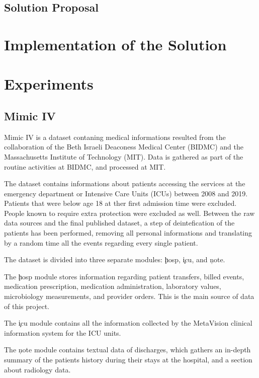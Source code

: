 \documentclass[]{marticle}
\begin{document}
\subsection{Solution Proposal}

\section{Implementation of the Solution}

\section{Experiments}

\subsection{Mimic IV}

Mimic IV \cite{mimic-iv-cit} is a dataset contaning medical informations resulted from the collaboration
of the Beth Israeli Deaconess Medical Center (BIDMC) and the Massachusetts Institute of Technology
(MIT). Data is gathered as part of the routine activities at BIDMC, and processed at MIT.

The dataset contains informations about patients accessing the services at the emergency department
or Intensive Care Units (ICUs) between 2008 and 2019. Patients that were below age 18 at ther first
admission time were excluded. People known to require extra protection were excluded as well.
Between the raw data sources and the final published dataset, a step of deintefication of the
patients has been performed, removing all personal informations and translating by a random time all
the events regarding every single patient.

The dataset is divided into three separate modules: \c{hosp}, \c{icu}, and \c{note}.

The \c{hosp} module stores information regarding patient transfers, billed events, medication
prescription, medication administration, laboratory values, microbiology measurements, and provider
orders. This is the main source of data of this project.

The \c{icu} module contains all the information collected by the MetaVision clinical information
system for the ICU units.

The \c{note} module contains textual data of discharges, which gathers an in-depth summary of the
patients history during their stays at the hospital, and a section about radiology data.
\end{document}
